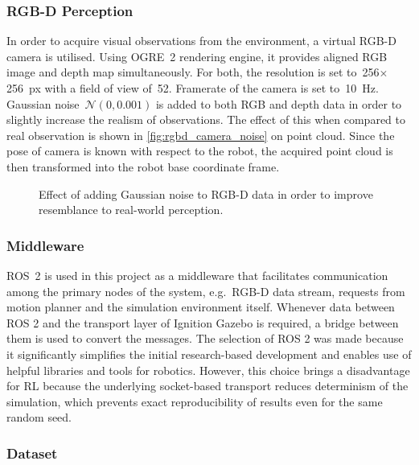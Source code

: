 \subsubsection{RGB-D Perception}

In order to acquire visual observations from the environment, a virtual RGB-D camera is utilised. Using OGRE~2 rendering engine, it provides aligned RGB image and depth map simultaneously. For both, the resolution is set to~256\({\times}\)256~px with a field of view of~52\textdegree. Framerate of the camera is set to~10~Hz. Gaussian noise~\(\mathcal{N}(0, 0.001)\) is added to both RGB and depth data in order to slightly increase the realism of observations. The effect of this when compared to real observation is shown in \autoref{fig:rgbd_camera_noise} on point cloud. Since the pose of camera is known with respect to the robot, the acquired point cloud is then transformed into the robot base coordinate frame.

\begin{figure}[ht]
    \centering
    \caption{Effect of adding Gaussian noise to RGB-D data in order to improve resemblance to real-world perception.}
    \label{fig:rgbd_camera_noise}
\end{figure}


\subsubsection{Middleware}

ROS~2 is used in this project as a middleware that facilitates communication among the primary nodes of the system, e.g.~RGB-D data stream, requests from motion planner and the simulation environment itself. Whenever data between ROS 2 and the transport layer of Ignition Gazebo is required, a bridge between them is used to convert the messages. The selection of ROS 2 was made because it significantly simplifies the initial research-based development and enables use of helpful libraries and tools for robotics. However, this choice brings a disadvantage for RL because the underlying socket-based transport reduces determinism of the simulation, which prevents exact reproducibility of results even for the same random seed.


\subsubsection{Dataset}


